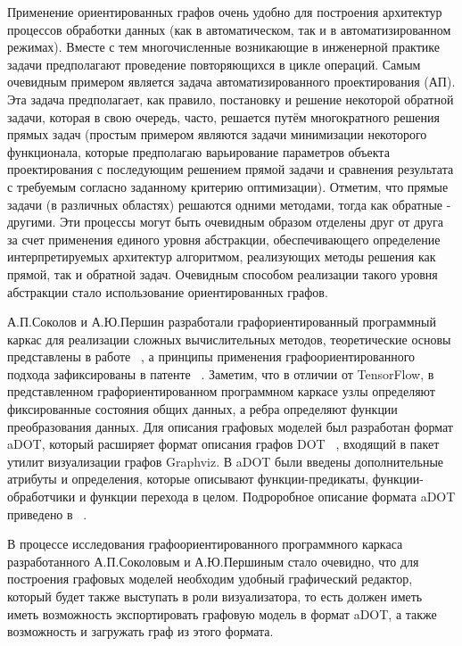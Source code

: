 Применение ориентированных графов очень удобно для построения архитектур процессов обработки данных (как в автоматическом, так и в автоматизированном режимах). Вместе с тем многочисленные возникающие в инженерной практике задачи предполагают проведение повторяющихся в цикле операций. Самым очевидным примером является задача автоматизированного проектирования (АП). Эта задача предполагает, как правило, постановку и решение некоторой обратной задачи, которая в свою очередь, часто, решается путём многократного решения прямых задач (простым примером являются задачи минимизации некоторого функционала, которые предполагаю варьирование параметров объекта проектирования с последующим решением прямой задачи и сравнения результата с требуемым согласно заданному критерию оптимизации). Отметим, что прямые задачи (в различных областях) решаются одними методами, тогда как обратные - другими. Эти процессы могут быть очевидным образом отделены друг от друга за счет применения единого уровня абстракции, обеспечивающего определение интерпретируемых архитектур  алгоритмом, реализующих методы решения как прямой, так и обратной задач. Очевидным способом реализации такого уровня абстракции стало использование ориентированных графов.

А.П.Соколов и А.Ю.Першин разработали графориентированный программный каркас для реализации сложных вычислительных методов, теоретические основы представлены в работе ~\cite{SokPersh2018GBSE}, а принципы применения графоориентированного подхода зафиксированы в патенте ~\cite{patentRU2681408}. Заметим, что в отличии от TensorFlow, в представленном графориентированном программном каркасе узлы определяют фиксированные состояния общих данных, а ребра определяют функции преобразования данных. Для описания графовых моделей был разработан формат aDOT, который расширяет формат описания графов DOT ~\cite{GraphsDOT}, входящий в пакет утилит визуализации графов Graphviz. В aDOT были введены дополнительные атрибуты и определения, которые описывают функции-предикаты, функции-обработчики и функции перехода в целом. Подроробное описание формата aDOT приведено в ~\cite{SokADOT}.

В процессе исследования графоориентированного программного каркаса разработанного А.П.Соколовым и А.Ю.Першиным стало очевидно, что для построения графовых моделей необходим удобный графический редактор, который будет также выступать в роли визуализатора, то есть должен иметь иметь возможность экспортировать графовую модель в формат aDOT, а также возможность и загружать граф из этого формата.



